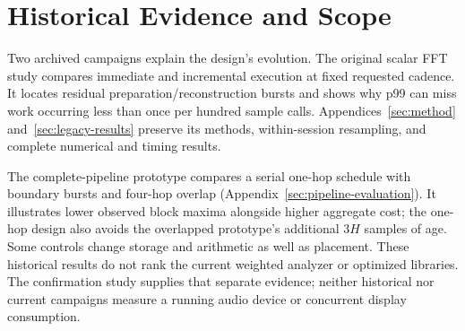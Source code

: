 \section{Historical Evidence and Scope}
\label{sec:historical-evidence}
Two archived campaigns explain the design's evolution. The original scalar
FFT study compares immediate and incremental execution at fixed requested
cadence. It locates residual preparation/reconstruction bursts and shows why
p99 can miss work occurring less than once per hundred sample calls.
Appendices~\ref{sec:method} and~\ref{sec:legacy-results} preserve its methods,
within-session resampling, and complete numerical and timing results.

The complete-pipeline prototype compares a serial one-hop schedule with
boundary bursts and four-hop overlap (Appendix~\ref{sec:pipeline-evaluation}).
It illustrates lower observed block maxima alongside higher aggregate cost;
the one-hop design also avoids the overlapped prototype's additional $3H$
samples of age. Some controls change storage and arithmetic as well as
placement. These historical results do not rank the current weighted analyzer
or optimized libraries. The confirmation study supplies that separate
evidence; neither historical nor current campaigns measure a running audio
device or concurrent display consumption.
